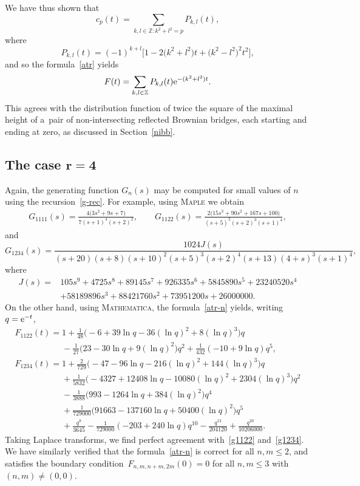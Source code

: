\documentclass[pdftex]{sigma}
\theoremstyle{definition}
\newcommand\Z{{\mathbb Z}}
\begin{document}
We have thus shown that
\begin{equation}\label{cp-P3} c_p(t)=\sum_{k,l\in\Z\colon k^2+l^2=p} P_{k,l}(t),\end{equation}
where
\[P_{k,l}(t) = (-1)^{k+l}\big[ 1 - 2\big(k^2+l^2\big) t + \big(k^2-l^2\big)^2 t^2\big],\]
and so the formula~\eqref{atr} yields
\[
F( t) = \sum_{k,l\in\Z} P_{k,l}(t) {\rm e}^{-(k^2+l^2)t}.
\]
This agrees with the distribution function of twice the square of the maximal height of a~pair of non-intersecting
reflected Brownian bridges, each starting and ending at zero, as discussed in Section~\ref{nibb}.

\subsection[The case r=4]{The case $\boldsymbol{r=4}$}

Again, the generating function $G_n(s)$ may be computed for small values of $n$ using the recursion~\eqref{g-rec}.
For example, using \textsc{Maple} we obtain
\begin{gather}
G_{1111}(s)=
\frac{4\big(3s^2 + 9s + 7\big)}{7(s + 1)^4(s + 2)^2},
\qquad
G_{1122}(s)=
\frac{2\big(15s^3 + 90s^2 + 167s + 100\big)}{(s + 5)^2(s + 2)^3(s + 1)^4},\label{g1122}
\end{gather}
and
\begin{equation}\label{g1234}
G_{1234}(s)=\frac{1024 J(s)}{(s + 20)(s + 8)(s + 10)^2(s + 5)^3(s + 2)^4(s + 13)(4 + s)^3(s + 1)^4},
\end{equation}
where
\begin{align*}
J(s)={}&105s^9 + 4725s^8 + 89145s^7 + 926335s^6 + 5845890s^5 + 23240520s^4\\
& + 58189896s^3 + 88421760s^2 + 73951200s + 26000000.
\end{align*}
On the other hand, using \textsc{Mathematica}, the formula~\eqref{atr-n} yields, writing $q={\rm e}^{-t}$,
\begin{gather*}
F_{1122}(t) = 1 + \frac1{48} \big(-6 + 39 \ln q - 36 (\ln q)^2 + 8 (\ln q)^3\big) q \\
 \phantom{F_{1122}(t) = }{}- \frac1{27} \big(23 - 30 \ln q + 9 (\ln q)^2\big) q^2 + \frac1{432} (-10+9\ln q) q^5,
\\
F_{1234}(t) = 1 +
 \frac{2}{729} \big(-47 - 96 \ln q - 216 (\ln q)^2 + 144 (\ln q)^3\big) q \\
 \phantom{F_{1234}(t) =}{}+ \frac1{5832} \big(-4327 + 12408 \ln q - 10080 (\ln q)^2 + 2304 (\ln q)^3\big) q^2 \\
\phantom{F_{1234}(t) =}{} - \frac1{3888} \big(993 - 1264 \ln q + 384 (\ln q)^2\big) q^4\\
\phantom{F_{1234}(t) =}{} + \frac1{729000} \big(91663 - 137160 \ln q + 50400 (\ln q)^2\big) q^5 \\
\phantom{F_{1234}(t) =}{}+ \frac{q^8}{3645} - \frac1{729000} (-203 + 240 \ln q) q^{10} - \frac{q^{13}}{204120} + \frac{q^{20}}{10206000}.
\end{gather*}
Taking Laplace transforms, we find perfect agreement with~\eqref{g1122} and~\eqref{g1234}.
We have similarly verified that the formula~\eqref{atr-n} is correct for all $n,m\le 2$, and satisfies
the boundary condition~${F_{n,m,n+m,2m}(0)=0}$ for all $n,m\le 3$ with $(n,m)\ne (0,0)$.
\end{document}
